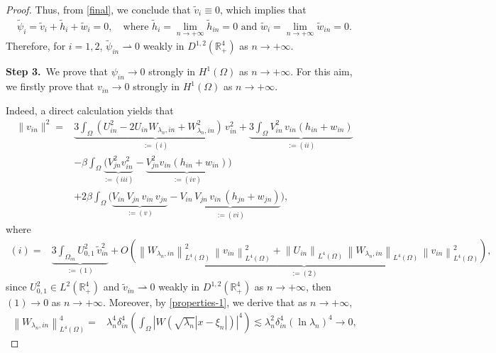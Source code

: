 \documentclass[10pt,a4paper]{amsart}
\newcommand{\R}{\mathbb{R}}
\begin{document}
\begin{proof}
Thus, from \eqref{final}, we conclude that $ \widetilde{v}_i\equiv 0$, which implies that 
\begin{align*}
    \widetilde{\psi}_i=\widetilde{v}_i+\widetilde{h}_i+\widetilde{w}_i=0,\quad\text{where $\widetilde{h}_i=\lim_{n\to+\infty}\widetilde{h}_{in}=0$ and $\widetilde{w}_i=\lim_{n\to+\infty}\widetilde{w}_{in}=0$.} 
\end{align*}
Therefore, for $i=1,2$, \( \widetilde{\psi}_{in}\rightharpoonup 0 \) weakly in \(D^{1,2}(\R^4_{+})\) as $n \rightarrow+\infty$.

{\textbf{Step 3.}~We prove that \( {\psi}_{in}\to 0 \) strongly in \(H^{1}(\Omega)\) as $n \rightarrow+\infty$}. For this aim, we firstly prove that  \( {v}_{in}\to 0 \) strongly in \(H^{1}(\Omega)\) as $n \rightarrow+\infty$.  

Indeed, a direct calculation yields that
\begin{align*}
    \|v_{in}\|^2=&\underbrace{3\displaystyle\int_{ \Omega} \left(U_{in}^2-2U_{in}W_{\lambda_n,in}+W_{\lambda_n,in}^2\right)\,v_{in}^2}_{:=(i)}+\underbrace{3\displaystyle\int_{ \Omega} V_{in}^2\,v_{in}(h_{in}+w_{in})}_{:=(ii)}\\
    &-\beta\displaystyle\int_{ \Omega} \underbrace{\big(V_{jn}^2v_{in}^2}_{:=(iii)}-\underbrace{V_{jn}^2v_{in}\left(h_{in}+w_{in}\right)}_{:=(iv)}\big)\\
    &+2\beta\displaystyle\int_{ \Omega} \big(\underbrace{V_{in}\,V_{jn}\,v_{in}\,v_{jn}}_{:=(v)}-\underbrace{V_{in}\,V_{jn}\,v_{in}\,(h_{jn}+w_{jn})}_{:=(vi)}\big),
\end{align*}
where
\begin{align*}
    (i)
    =&\underbrace{3\displaystyle\int_{ \Omega_{in}} U_{0,1}^2\,\widetilde{v}_{{in}}^2}_{:=(1)}+\underbrace{O\left(\left\|W_{\lambda_n,in}\right\|_{L^4(\Omega)}^2\,\left\|v_{in}\right\|_{L^4(\Omega)}^2+\left\|U_{in}\right\|_{L^4(\Omega)}\,\left\|W_{\lambda_n,in}\right\|_{L^4(\Omega)}\,\left\|v_{in}\right\|_{L^4(\Omega)}^2\right)}_{:=(2)},
\end{align*}
since $U_{0,1}^2\in L^{2}(\R^4_{+})$ and \( \widetilde{v}_{in}\rightharpoonup 0 \) weakly in \(D^{1,2}(\R^4_{+})\) as $n \rightarrow+\infty$, then $(1)\to 0$ as $n \rightarrow+\infty$. Moreover, by \eqref{properties-1}, we derive that as $n \rightarrow+\infty$,
\begin{align}\label{W-N}
\left\|W_{\lambda_n,in}\right\|_{L^4(\Omega)}^4=&\lambda_n^4\delta_{in}^4\left(\displaystyle\int_{ \Omega}\left|W\left(\sqrt{\lambda_n}|x-\xi_n|\right)\right|^4\right)
\lesssim\lambda^2_{n}\delta_{in}^4\left(\ln{\lambda_n}\right)^4\to 0,

\end{align}
\end{proof}
\end{document}
